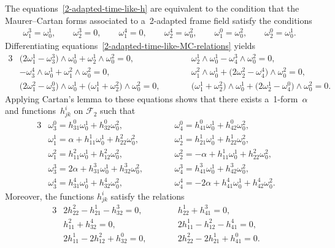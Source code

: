 \documentclass[10pt,a4paper]{amsart}
\numberwithin{equation}{section}
\theoremstyle{definition}
\begin{document}
The equations~\eqref{2-adapted-time-like-h} are equivalent to the condition that the Maurer--Cartan forms associated to
a~2-adapted frame f\/ield satisfy the conditions
\begin{gather}
\omega^3_1=\omega^1_0,
\qquad
\omega^3_2=0,
\qquad
\omega^4_1=0,
\qquad
\omega^4_2=\omega^2_0,
\qquad
\omega^0_1=\omega^2_0,
\qquad
\omega^0_2=\omega^1_0.
\label{2-adapted-time-like-MC-relations}
\end{gather}
Dif\/ferentiating equations~\eqref{2-adapted-time-like-MC-relations} yields
\begin{alignat*}{3}
& \big(2\omega^1_1 - \omega^3_3\big) \wedge \omega^1_0 + \omega^1_2 \wedge \omega^2_0 = 0,
\qquad &&
\omega^1_2 \wedge \omega^1_0 - \omega^3_4 \wedge \omega^2_0 = 0,&
\\
& -\omega^4_3 \wedge \omega^1_0 + \omega^2_1 \wedge \omega^2_0 = 0,
\qquad &&
\omega^2_1 \wedge \omega^1_0 + \big(2\omega^2_2 - \omega^4_4\big) \wedge \omega^2_0 = 0,&
\\
& \big(2\omega^2_1 - \omega^0_3\big) \wedge \omega^1_0 + \big(\omega^1_1 + \omega^2_2\big) \wedge \omega^2_0 = 0,
\qquad &&
\big(\omega^1_1 + \omega^2_2\big) \wedge \omega^1_0 + \big(2\omega^1_2 - \omega^0_4\big) \wedge \omega^2_0 = 0.&
\end{alignat*}
Applying Cartan's lemma to these equations shows that there exists a~1-form~$\alpha$ and func\-tions~$h^i_{jk}$ on
$\mathcal{F}_2$ such that
\begin{alignat}{3}
&\omega^0_3=h^0_{31}\omega^1_0 + h^0_{32}\omega^2_0,
\qquad&&
\omega^0_4=h^0_{41}\omega^1_0 + h^0_{42}\omega^2_0,&
\nonumber
\\
&\omega^1_1=\alpha + h^1_{11}\omega^1_0 + h^2_{22}\omega^2_0,
\qquad&&
\omega^1_2=h^1_{21}\omega^1_0 + h^1_{22}\omega^2_0,&
\nonumber
\\
&\omega^2_1=h^2_{11}\omega^1_0 + h^2_{12}\omega^2_0,
\qquad&&
\omega^2_2=-\alpha + h^1_{11}\omega^1_0 + h^2_{22}\omega^2_0,&
\nonumber
\\
&\omega^3_3=2\alpha + h^3_{31}\omega^1_0 + h^3_{32}\omega^2_0,
\qquad&&
\omega^3_4=h^3_{41}\omega^1_0 + h^3_{42}\omega^2_0,&
\nonumber
\\
&\omega^4_3=h^4_{31}\omega^1_0 + h^4_{32}\omega^2_0,
\qquad&&
\omega^4_4=-2\alpha + h^4_{41}\omega^1_0 + h^4_{42}\omega^2_0.&
\label{2-adapted-time-like-MC-semi-basic-forms}
\end{alignat}
Moreover, the functions $h^i_{jk}$ satisfy the relations
\begin{alignat}{3}
& 2 h^2_{22} - h^1_{21} - h^3_{32} = 0,
\qquad &&
h^1_{22} + h^3_{41} = 0,&
\nonumber
\\
&h^2_{11} + h^4_{32} = 0,
\qquad &&
2 h^1_{11} - h^2_{12} - h^4_{41} = 0,&
\nonumber
\\
& 2 h^1_{11} - 2 h^2_{12} + h^0_{32} = 0,
\qquad &&
2 h^2_{22} - 2 h^1_{21} + h^0_{41} = 0.&
\label{2-adapted-time-like-h-relations}
\end{alignat}
\end{document}

